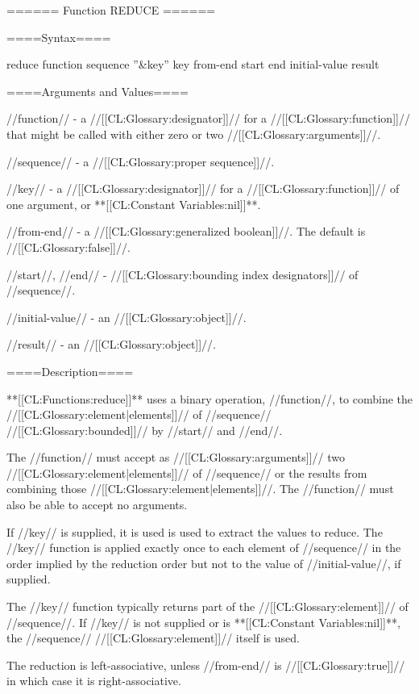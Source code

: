 ====== Function REDUCE ======

====Syntax====

\DefunWithValues reduce {function sequence ''&key'' key from-end start end initial-value} {result}

====Arguments and Values====

//function// - a //[[CL:Glossary:designator]]// for a //[[CL:Glossary:function]]// that might be called with either zero or two //[[CL:Glossary:arguments]]//.

//sequence// - a //[[CL:Glossary:proper sequence]]//.

//key// - a //[[CL:Glossary:designator]]// for a //[[CL:Glossary:function]]// of one argument, or **[[CL:Constant Variables:nil]]**.

//from-end// - a //[[CL:Glossary:generalized boolean]]//. The default is //[[CL:Glossary:false]]//.


//start//, //end// - //[[CL:Glossary:bounding index designators]]// of //sequence//. 

//initial-value// - an //[[CL:Glossary:object]]//.

//result// - an //[[CL:Glossary:object]]//.

====Description====

**[[CL:Functions:reduce]]** uses a binary operation, //function//, to combine the //[[CL:Glossary:element|elements]]// of //sequence// //[[CL:Glossary:bounded]]// by //start// and //end//.

The //function// must accept as //[[CL:Glossary:arguments]]// two //[[CL:Glossary:element|elements]]// of //sequence// or the results from combining those //[[CL:Glossary:element|elements]]//. The //function// must also be able to accept no arguments.

If //key// is supplied, it is used is used to extract the values to reduce. The //key// function is applied exactly once to each element of //sequence// in the order implied by the reduction order but not to the value of //initial-value//, if supplied.

The //key// function typically returns part of the //[[CL:Glossary:element]]// of //sequence//. If //key// is not supplied or is **[[CL:Constant Variables:nil]]**, the //sequence// //[[CL:Glossary:element]]// itself is used.

The reduction is left-associative, unless //from-end// is //[[CL:Glossary:true]]// in which case it is right-associative.

